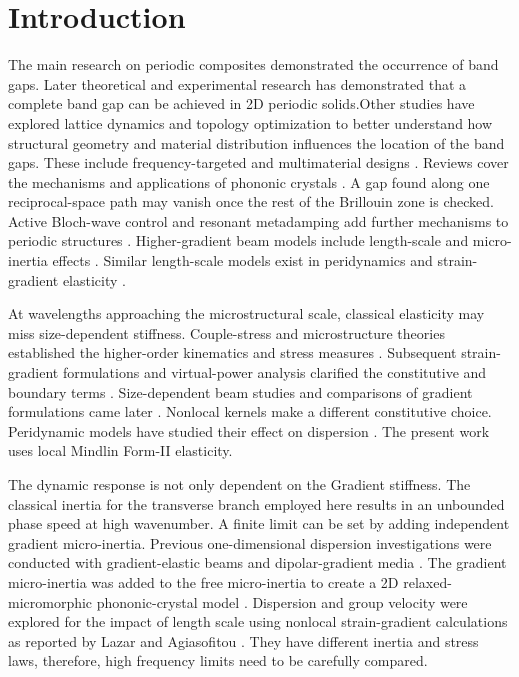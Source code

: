 \section{Introduction}
\label{sec:intro}

The main research on periodic composites demonstrated the occurrence of band gaps. Later theoretical and experimental research has demonstrated that a complete band gap can be achieved in 2D periodic solids\cite{SigalasEconomou1992,kushwaha1993,vasseur2001}.Other studies have explored lattice dynamics and topology optimization to better understand how structural geometry and material distribution influences the location of the band gaps\cite{MartinssonMovchan2003,SigmundJensen2003,Dalklint2022}. These include frequency-targeted and multimaterial designs \cite{He2026,Nakayama2025}. Reviews cover the mechanisms and applications of phononic crystals \cite{Vasileiadis2021}. A gap found along one reciprocal-space path may vanish once the rest of the Brillouin zone is checked. Active Bloch-wave control and resonant metadamping add further mechanisms to periodic structures \cite{IJESBadinoBacigalupo2026,IJESZhaoZhangWuHu2026}. Higher-gradient beam models include length-scale and micro-inertia effects \cite{IJESAyadKarathanasopoulosGanghofferLakiss2020}. Similar length-scale models exist in peridynamics and strain-gradient elasticity \cite{IJESChanChen2023,IJESFuZhouQi2020}.

At wavelengths approaching the microstructural scale, classical elasticity may miss size-dependent stiffness. Couple-stress and microstructure theories established the higher-order kinematics and stress measures \cite{toupin1962,MindlinTiersten1962,mindlin1964,Mindlin1965}. Subsequent strain-gradient formulations and virtual-power analysis clarified the constitutive and boundary terms \cite{mindlineshel1968,Germain1973}. Size-dependent beam studies and comparisons of gradient formulations came later \cite{LamYangChongWangTong2003,askesaifantis2011,polyzosfotiadis2012}. Nonlocal kernels make a different constitutive choice. Peridynamic models have studied their effect on dispersion \cite{IJESEremeyevNaumenko2025}. The present work uses local Mindlin Form-II elasticity.

The dynamic response is not only dependent on the Gradient stiffness. The classical inertia for the transverse branch employed here results in an unbounded phase speed at high wavenumber. A finite limit can be set by adding independent gradient micro-inertia. Previous one-dimensional dispersion investigations were conducted with gradient-elastic beams and dipolar-gradient media \cite{papargyribeskou2009,liweizhou2016}. The gradient micro-inertia was added to the free micro-inertia to create a 2D relaxed-micromorphic phononic-crystal model \cite{MadeoColletMiniaciBillonOuisseNeff2018}. Dispersion and group velocity were explored for the impact of length scale using nonlocal strain-gradient calculations as reported by Lazar and Agiasofitou \cite{IJESLazarAgiasofitou2026}. They have different inertia and stress laws, therefore, high frequency limits need to be carefully compared.

